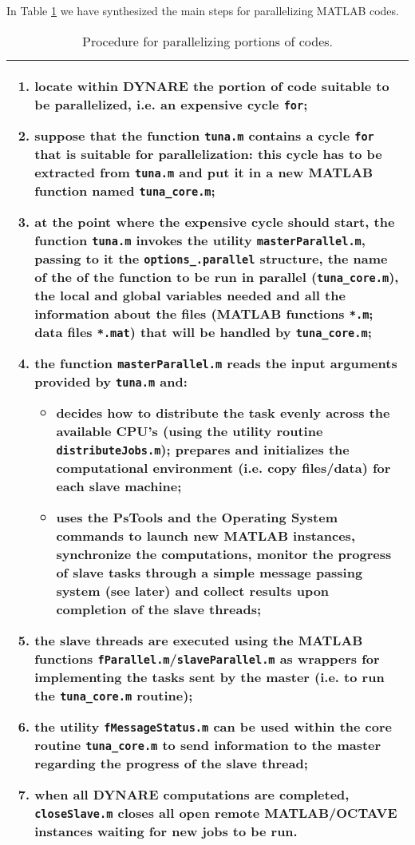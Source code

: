 \documentclass[12pt,a4paper,pdftex]{article}
\begin{document}
In Table \ref{tab:devpar} we have synthesized the main steps for parallelizing MATLAB codes.

{\small
\begin{table}
\begin{tabular}{|p{\linewidth}|}
\hline
\begin{enumerate}
\item locate within DYNARE the portion of code suitable to be parallelized, i.e. an expensive cycle \verb"for";
\item suppose that the function \verb"tuna.m" contains a cycle \verb"for" that is suitable for parallelization: this cycle has to be extracted from \verb"tuna.m" and put it in a new MATLAB function named \verb"tuna_core.m";
\item at the point where the expensive cycle should start, the function \verb"tuna.m" invokes the utility \verb"masterParallel.m", passing to it the \verb"options_.parallel" structure, the name of the of the function to be run in parallel (\verb"tuna_core.m"), the local and global variables needed and all the information about the files (MATLAB functions \verb"*.m"; data files \verb"*.mat") that will be handled by \verb"tuna_core.m";
\item the function \verb"masterParallel.m" reads the input arguments provided by \verb"tuna.m" and:
\begin{itemize}
\item decides how to distribute the task evenly across the available CPU's (using the utility routine \verb"distributeJobs.m"); prepares and initializes the computational environment (i.e. copy files/data) for each slave machine;
\item uses the PsTools and the Operating System commands to launch new MATLAB instances, synchronize the computations, monitor the progress of slave tasks through a simple message passing system (see later) and collect results upon completion of the slave threads;
\end{itemize}
\item the slave threads are executed using the MATLAB functions \verb"fParallel.m"/\verb"slaveParallel.m" as wrappers for implementing the tasks sent by the master (i.e. to run the \verb"tuna_core.m" routine);
\item the utility \verb"fMessageStatus.m" can be used within the core routine \verb"tuna_core.m" to send information to the master regarding the progress of the slave thread;
\item when all DYNARE computations are completed, \verb"closeSlave.m" closes all open remote MATLAB/OCTAVE instances waiting for new jobs to be run.
\end{enumerate}
\\ \hline
\end{tabular}
\caption{Procedure for parallelizing portions of codes.}\label{tab:devpar}
\end{table}
}
\end{document}
